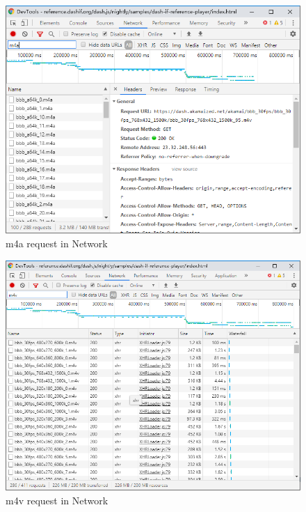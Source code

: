\documentclass[12pt,letterpaper]{ctexart}
\begin{document}
\begin{itemize}
  \begin{figure}[H]
    \centering
    \includegraphics[width=0.7\linewidth,natwidth=610,natheight=642]{assets/6.1_m4a.png}
    \caption{m4a request in Network}
    \label{fig:m4a}
  \end{figure}

  \begin{figure}[H]
    \centering
    \includegraphics[width=0.65\linewidth,natwidth=650,natheight=642]{assets/6.1_m4v.png}
    \caption{m4v request in Network}
    \label{fig:m4v}
  \end{figure}
\end{itemize}
\end{document}

